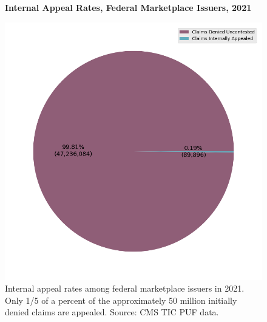 \documentclass[psamsfonts]{amsart}
\theoremstyle{plain}
\theoremstyle{definition}
\theoremstyle{remark}
\begin{document}
\begin{figure}
	\centering
	\textbf{Internal Appeal Rates, Federal Marketplace Issuers, 2021}\par\medskip
	\includegraphics[width=0.85\columnwidth]{images/cms_puf/internal_appeal_rates_all_insurers.png}
	\caption{ Internal appeal rates among federal marketplace issuers in 2021. Only 1/5 of a percent of the approximately 50 million initially denied claims are appealed. Source: CMS TIC PUF data.}
	\label{federal_internal_appeal_rates}
\end{figure}
\end{document}
